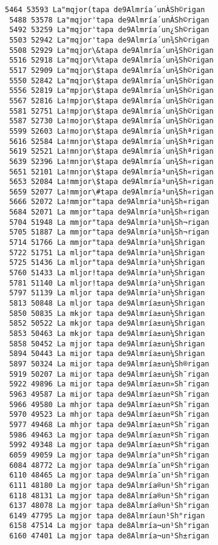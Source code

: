 \documentclass[11pt]{article}
\begin{document}
\begin{Verbatim}[commandchars=\\\{\}]
 5464 53593 La"mqjor(tapa de9Almría´unÀSh©rigan
 5488 53578 La"mqjor'tapa de9Almría´unÀSh©rigan
 5492 53259 La"mqjor'tapa de9Almría´un¿Sh©rigan
 5503 52942 La"mqjor'tapa de9Almría´un¾Sh©rigan
 5508 52929 La"mqjor\&tapa de9Almría´un¾Sh©rigan
 5516 52918 La"mqjor\%tapa de9Almría´un¾Sh©rigan
 5517 52909 La"mqjor\$tapa de9Almría´un¾Sh©rigan
 5550 52842 La"mqjor\$tapa de9Almría´un¾Sh©rigan
 5556 52819 La"mpjor\$tapa de9Almría´un¾Sh©rigan
 5567 52816 La!mpjor\$tapa de9Almría´un¾Sh©rigan
 5581 52751 La!mpjor\$tapa de9Almría´un¾Sh©rigan
 5587 52730 La!mojor\$tapa de9Almría´un¾Sh©rigan
 5599 52603 La!mojor\$tapa de9Almría´un¾Shªrigan
 5616 52584 La!mnjor\$tapa de9Almría´un¾Shªrigan
 5619 52521 La!mnjor\$tapa de9Almría´un¾Shªrigan
 5639 52396 La!mnjor\$tapa de9Almría´un¾Sh«rigan
 5651 52101 La!mnjor\$tapa de9Almría³un¾Sh«rigan
 5653 52084 La!mmjor\$tapa de9Almría³un¾Sh«rigan
 5659 52077 La!mmjor\#tapa de9Almría³un¾Sh«rigan
 5666 52072 La!mmjor"tapa de9Almría³un¾Sh«rigan
 5684 52071 La mmjor"tapa de9Almría³un¾Sh«rigan
 5704 51948 La mmjor"tapa de9Almría³un¾Sh¬rigan
 5705 51887 La mmjor"tapa de9Almría³un¾Sh¬rigan
 5714 51766 La mmjor"tapa de9Almría³un¾Sh­rigan
 5722 51751 La mljor"tapa de9Almría³un¾Sh­rigan
 5725 51436 La mljor"tapa de9Almría³un½Sh­rigan
 5760 51433 La mljor!tapa de9Almría³un½Sh­rigan
 5781 51140 La mljor!tapa de9Almría²un½Sh­rigan
 5797 51139 La mljor tapa de9Almría²un½Sh­rigan
 5813 50848 La mljor tapa de9Almría±un½Sh­rigan
 5850 50835 La mkjor tapa de9Almría±un½Sh­rigan
 5852 50522 La mkjor tapa de9Almría±un¼Sh­rigan
 5853 50463 La mkjor tapa de9Almría±un¼Sh­rigan
 5858 50452 La mjjor tapa de9Almría±un¼Sh­rigan
 5894 50443 La mijor tapa de9Almría±un¼Sh­rigan
 5897 50324 La mijor tapa de9Almría±un¼Sh®rigan
 5919 50207 La mijor tapa de9Almría±un¼Sh¯rigan
 5922 49896 La mijor tapa de9Almría±un»Sh¯rigan
 5963 49587 La mijor tapa de9Almría±unºSh¯rigan
 5966 49580 La mhjor tapa de9Almría±unºSh¯rigan
 5970 49523 La mhjor tapa de9Almría±unºSh¯rigan
 5977 49468 La mhjor tapa de9Almría±unºSh¯rigan
 5986 49463 La mgjor tapa de9Almría±unºSh¯rigan
 5992 49348 La mgjor tapa de9Almría±unºSh°rigan
 6059 49059 La mgjor tapa de9Almría°unºSh°rigan
 6084 48772 La mgjor tapa de9Almría¯unºSh°rigan
 6110 48465 La mgjor tapa de9Almría¯un¹Sh°rigan
 6111 48180 La mgjor tapa de9Almría®un¹Sh°rigan
 6118 48131 La mgjor tapa de8Almría®un¹Sh°rigan
 6137 48078 La mgjor tapa de8Almría®un¹Sh°rigan
 6149 47795 La mgjor tapa de8Almría­un¹Sh°rigan
 6158 47514 La mgjor tapa de8Almría¬un¹Sh°rigan
 6160 47401 La mgjor tapa de8Almría¬un¹Sh±rigan

\end{Verbatim}
\end{document}
